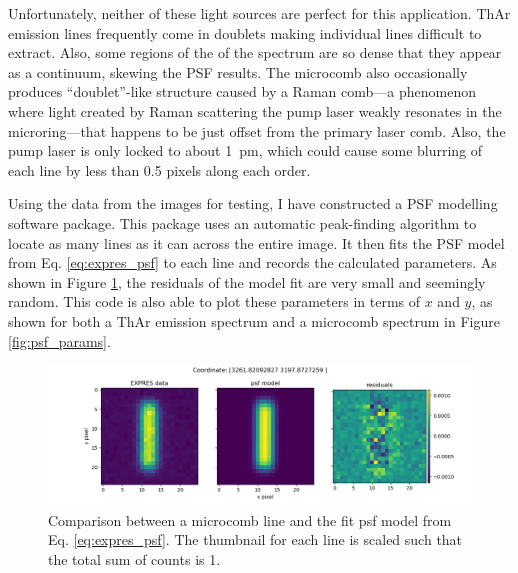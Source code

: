 \documentclass[11pt]{article}
\begin{document}
Unfortunately, neither of these light sources are perfect for this application. ThAr emission lines frequently come in doublets making individual lines difficult to extract. Also, some regions of the of the spectrum are so dense that they appear as a continuum, skewing the PSF results. The microcomb also occasionally produces ``doublet''-like structure caused by a Raman comb---a phenomenon where light created by Raman scattering the pump laser weakly resonates in the microring---that happens to be just offset from the primary laser comb. Also, the pump laser is only locked to about \SI{1}{\pico\meter}, which could cause some blurring of each line by less than 0.5 pixels along each order.

Using the data from the images for testing, I have constructed a PSF modelling software package. This package uses an automatic peak-finding algorithm to locate as many lines as it can across the entire image. It then fits the PSF model from Eq. \ref{eq:expres_psf} to each line and records the calculated parameters. As shown in Figure \ref{fig:psf_comparison}, the residuals of the model fit are very small and seemingly random. This code is also able to plot these parameters in terms of $x$ and $y$, as shown for both a ThAr emission spectrum and a microcomb spectrum in Figure \ref{fig:psf_params}.

\begin{figure}
    \centering
    \includegraphics[width=\textwidth]{images/psf_comparison.png}
    \caption{Comparison between a microcomb line and the fit psf model from Eq. \ref{eq:expres_psf}. The thumbnail for each line is scaled such that the total sum of counts is 1.}
    \label{fig:psf_comparison}
\end{figure}
\end{document}
